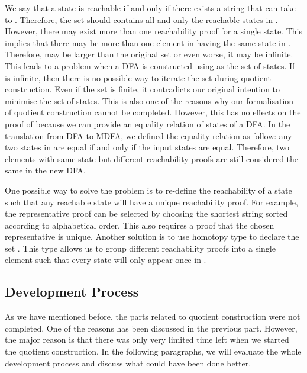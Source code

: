 \par We say that a state  is reachable if and
only if there exists a string  that can take  to
. Therefore, the set  should contains all and only the
reachable states in . However, there may exist more than one
reachability proof for a single state. This implies that there may be
more than one element in  having the same state in . Therefore, 
may be larger than the original set  or even worse, it may be
infinite. This leads to a problem when a DFA is constructed using
 as the set of states. If  is
infinite, then there is no possible way to iterate the set during 
quotient construction. Even if the set  is finite, it
contradicts our original intention to minimise the set of states. This is also one of the
reasons why our formalisation of quotient construction cannot be
completed. However, this has no effects on the proof of  because we can provide an equality relation of states of
a DFA. In the translation from DFA to MDFA, we defined
the equality relation as follow: any two states in  are equal if and only
if the input states are equal. Therefore, two elements with same state
but different reachability proofs are still considered the same in the new DFA. 

\par One possible way to solve the problem is to re-define the
reachability of a state such that any reachable state will have a
unique reachability proof. For example, the representative proof can
be selected by choosing the shortest string  sorted according
to alphabetical order. This also requires a proof that
the chosen representative is unique. Another solution is to use
homotopy type to declare the set . This type allows us to
group different reachability proofs into a single element such that
every state will only appear once in . 


\subsection{Development Process}
\par As we have mentioned before, the parts related to quotient
construction were not completed. One of the reasons
has been discussed in the previous part. However, the major reason is
that there was only very limited time left when we started the quotient
construction. In the following paragraphs, we will evaluate the whole
development process and discuss what could have been done better. 

